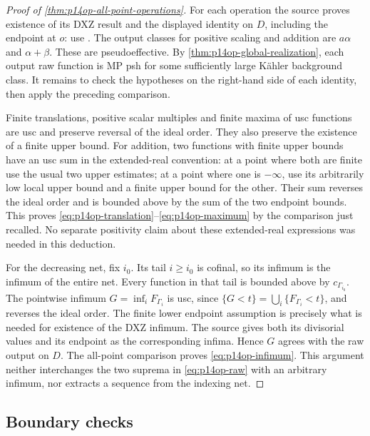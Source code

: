 \begin{proof}[Proof of \cref{thm:p14op-all-point-operations}]
For each operation the source proves existence of its DXZ result and the
displayed identity on \(D\), including the endpoint at \(o\): use
\cite[Proposition~4.4, Corollary~4.8, Definition~4.9,
Lemma~4.10 and Lemma~4.17]{Xia23}. The output classes for positive
scaling and addition are \(a\alpha\) and \(\alpha+\beta\).
These are pseudoeffective. By \cref{thm:p14op-global-realization},
each output raw function is MP psh for some sufficiently large K\"ahler
background class. It remains to check the hypotheses on the right-hand
side of each identity, then apply the preceding comparison.

Finite translations, positive scalar multiples and finite maxima of usc
functions are usc and preserve reversal of the ideal order. They also
preserve the existence of a finite upper bound. For addition, two functions
with finite upper bounds have an usc sum in the extended-real convention:
at a point where both are finite use the usual two upper estimates; at a
point where one is \(-\infty\), use its arbitrarily low local upper
bound and a finite upper bound for the other. Their sum reverses the ideal
order and is bounded above by the sum of the two endpoint bounds. This
proves \eqref{eq:p14op-translation}--\eqref{eq:p14op-maximum}
by the comparison just recalled. No separate positivity claim about these
extended-real expressions was needed in this deduction.

For the decreasing net, fix \(i_0\). Its tail \(i\geq i_0\) is
cofinal, so its infimum is the infimum of the entire net. Every function
in that tail is bounded above by \(c_{\Gamma_{i_0}}\). The pointwise
infimum \(G=\inf_i F_{\Gamma_i}\) is usc, since
\(\{G<t\}=\bigcup_i\{F_{\Gamma_i}<t\}\), and reverses the
ideal order. The finite lower endpoint assumption is precisely what is
needed for existence of the DXZ infimum. The source gives both its
divisorial values and its endpoint as the corresponding infima. Hence
\(G\) agrees with the raw output on \(D\). The all-point comparison
proves \eqref{eq:p14op-infimum}. This argument neither interchanges the
two suprema in \eqref{eq:p14op-raw} with an arbitrary infimum, nor
extracts a sequence from the indexing net.
\end{proof}

\subsection{Boundary checks}

